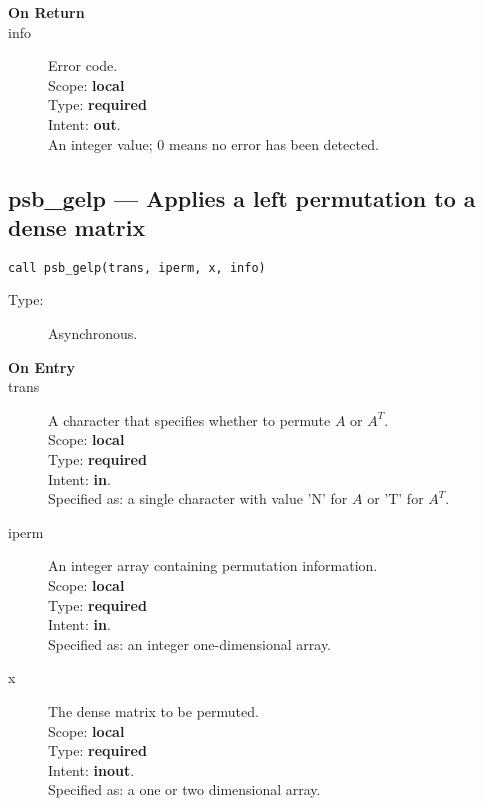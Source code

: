 \begin{description}
\item[\bf On Return]
\item[info] Error code.\\
Scope: {\bf local} \\
Type: {\bf required} \\
Intent: {\bf out}.\\
An integer value; 0 means no error has been detected. 
\end{description}


%
%
\clearpage\subsection*{psb\_gelp --- Applies a left permutation to a dense
  matrix}

\begin{verbatim}
call psb_gelp(trans, iperm, x, info)
\end{verbatim}

\begin{description}
\item[Type:] Asynchronous.
\item[\bf On Entry]
\item[trans] A character that specifies whether to permute $A$  or $A^T$.\\
Scope: {\bf local} \\
Type: {\bf required}\\
Intent: {\bf in}.\\
Specified as: a single character with value 'N' for $A$ or 'T' for $A^T$.\\
\item[iperm] An integer array containing permutation information.\\
Scope: {\bf local} \\
Type: {\bf required}\\
Intent: {\bf in}.\\
Specified as: an integer one-dimensional array.\\
\item[x] The dense matrix to be permuted.\\
Scope: {\bf local} \\
Type: {\bf required}\\
Intent: {\bf inout}.\\
Specified as: a one or two dimensional array.\\
\end{description}

